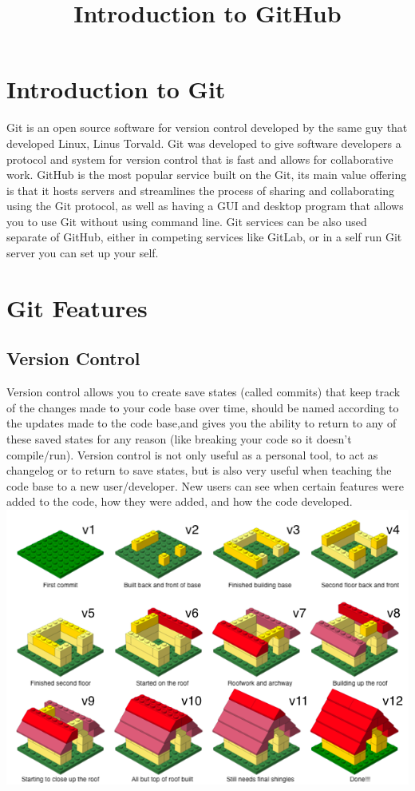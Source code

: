 \documentclass{article}
\author{}
\date{}
\title{\vspace{-4cm}Introduction to GitHub}
\begin{document}
\maketitle
\section{Introduction to Git}
Git is an open source software for version control developed by the same guy that developed Linux, Linus Torvald. Git was developed to give software developers a protocol and system for version control that is fast and allows for collaborative work. GitHub is the most popular service built on the Git, its main value offering is that it hosts servers and streamlines the process of sharing and collaborating using the Git protocol, as well as having a GUI and desktop program that allows you to use Git without using command line. Git services can be also used separate of GitHub, either in competing services like GitLab, or in a self run Git server you can set up your self.
\section{Git Features}
\subsection{Version Control}
Version control allows you to create save states (called commits) that keep track of the changes made to your code base over time, should be named according to the updates made to the code base,and gives you the ability to return to any of these saved states for any reason (like breaking your code so it doesn't compile/run). Version control is not only useful as a personal tool, to act as changelog or to return to save states, but is also very useful when teaching the code base to a new user/developer. New users can see when certain features were added to the code, how they were added, and how the code developed.
\includegraphics[width=\textwidth]{lego-steps-commit-messages.png}
\end{document}
